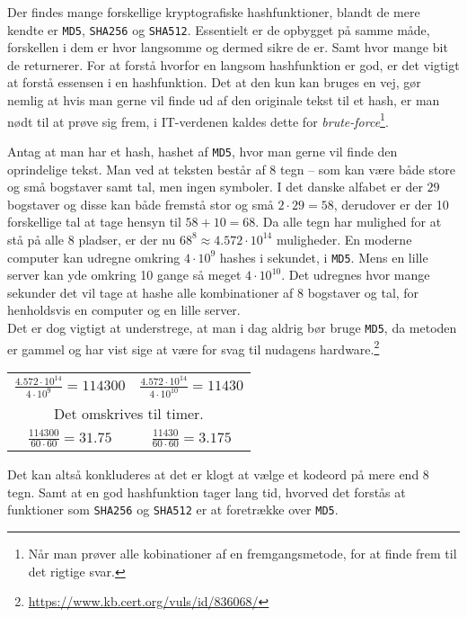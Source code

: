 Der findes mange forskellige kryptografiske hashfunktioner, blandt de mere kendte er \texttt{MD5}, \texttt{SHA256} og \texttt{SHA512}.\cite{algoritmer}
Essentielt er de opbygget på samme måde, forskellen i dem er hvor langsomme og dermed sikre de er. Samt hvor mange bit de returnerer.
For at forstå hvorfor en langsom hashfunktion er god, er det vigtigt at forstå essensen i en hashfunktion.
Det at den kun kan bruges en vej, gør nemlig at hvis man gerne vil finde ud af den originale tekst til et hash, er man nødt til at prøve sig frem, i IT-verdenen kaldes dette for \emph{brute-force}\footnote{Når man prøver alle kobinationer af en fremgangsmetode, for at finde frem til det rigtige svar.}.


\begin{eks}
    \label{brutefc}
    Antag at man har et hash, hashet af \texttt{MD5}, hvor man gerne vil finde den oprindelige tekst.
    Man ved at teksten består af 8 tegn -- som kan være både store og små bogstaver samt tal, men ingen symboler.
    I det danske alfabet er der \(29\) bogstaver og disse kan både fremstå stor og små \(2 \cdot 29 = 58\), derudover er der 10 forskellige tal at tage hensyn til \(58 + 10 = 68\).
    Da alle tegn har mulighed for at stå på alle 8 pladser, er der nu \(68^8\approx 4.572 \cdot 10^{14}\) muligheder.
    En moderne computer kan udregne omkring \(4 \cdot 10^9\) hashes i sekundet, i \texttt{MD5}.
    Mens en lille server kan yde omkring 10 gange så meget \(4 \cdot 10^{10}\).\cite{ytpwd}
    Det udregnes hvor mange sekunder det vil tage at hashe alle kombinationer af 8 bogstaver og tal, for henholdsvis en computer og en lille server.\\
    Det er dog vigtigt at understrege, at man i dag aldrig bør bruge \texttt{MD5}, da metoden er gammel og har vist sige at være for svag til nudagens hardware.\footnote{\url{https://www.kb.cert.org/vuls/id/836068/}}

    \setlength{\tabcolsep}{50pt} %
    \begin{center}
        \begin{tabular}{c c}

            \(\frac{4.572 \cdot 10^{14}}{4 \cdot 10^9} = 114300\) &
            \(\frac{4.572 \cdot 10^{14}}{4 \cdot 10^{10}} = 11430\)\\

            \multicolumn{2}{c}{Det omskrives til timer.}\\

            \(\frac{114300}{60 \cdot 60} = 31.75\) &
            \(\frac{11430}{60 \cdot 60} = 3.175\)\\

        \end{tabular}
    \end{center}

    \noindent
    Det kan altså konkluderes at det er klogt at vælge et kodeord på mere end 8 tegn.
    Samt at en god hashfunktion tager lang tid, hvorved det forstås at funktioner som \texttt{SHA256} og \texttt{SHA512} er at foretrække over \texttt{MD5}.
\end{eks}

